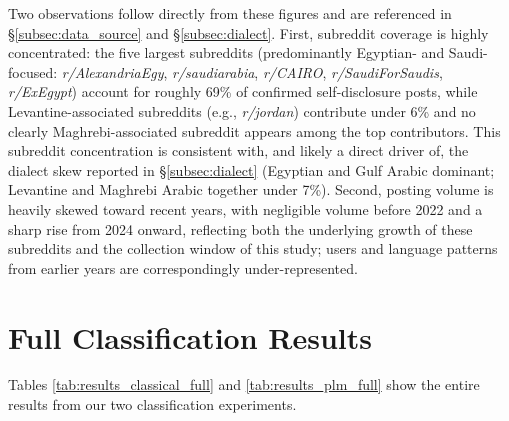 \documentclass[11pt]{article}
\begin{document}
Two observations follow directly from these figures and are referenced
in \S\ref{subsec:data_source} and \S\ref{subsec:dialect}. First, subreddit
coverage is highly concentrated: the five largest subreddits
(predominantly Egyptian- and Saudi-focused: \textit{r/AlexandriaEgy},
\textit{r/saudiarabia}, \textit{r/CAIRO}, \textit{r/SaudiForSaudis},
\textit{r/ExEgypt}) account for roughly 69\% of confirmed
self-disclosure posts, while Levantine-associated subreddits
(e.g., \textit{r/jordan}) contribute under 6\% and no clearly
Maghrebi-associated subreddit appears among the top contributors. This
subreddit concentration is consistent with, and likely a direct driver
of, the dialect skew reported in \S\ref{subsec:dialect} (Egyptian and
Gulf Arabic dominant; Levantine and Maghrebi Arabic together under
7\%). Second, posting volume is heavily skewed toward recent years,
with negligible volume before 2022 and a sharp rise from 2024 onward,
reflecting both the underlying growth of these subreddits and the
collection window of this study; users and language patterns from
earlier years are correspondingly under-represented.

\section{Full Classification Results}
Tables \ref{tab:results_classical_full} and \ref{tab:results_plm_full} show the entire results from our two classification experiments.

\label{app:full_results}
\end{document}
